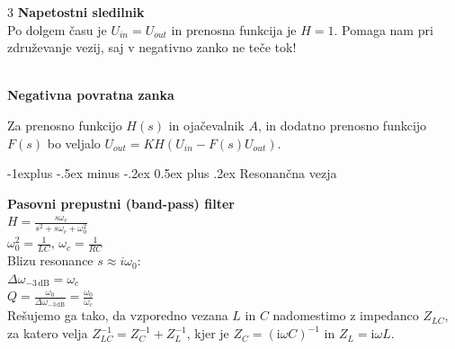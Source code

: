 \documentclass[10pt,landscape]{article}
\makeatletter
\renewcommand{\subsection}{\@startsection{subsection}{2}{0mm}%
	{-1explus -.5ex minus -.2ex}%
	{0.5ex plus .2ex}%
	{\normalfont\normalsize\bfseries}}
\theoremstyle{definition}
\makeatother
\begin{document}
\begin{multicols}{3}
  \textbf{Napetostni sledilnik} \\ 

  Po dolgem času je \( U_{in} = U_{out} \) in prenosna funkcija je \( H = 1 \). Pomaga nam pri združevanje vezij, saj v negativno zanko ne teče tok!
  \vspace{-35pt}
  \begin{circuitikz}
  \end{circuitikz} \vspace{20pt}\\

  \textbf{Negativna povratna zanka}

  Za prenosno funkcijo \( H(s) \) in ojačevalnik \( A \), in dodatno prenosno funkcijo \( F(s) \) bo veljalo \( U_{out} = K H \left( U_{in} - F(s) U_{out} \right) \).

  \subsection{Resonančna vezja}

  \textbf{Pasovni prepustni (band-pass) filter} \\
  $H = \frac{s \omega_c}{s^2 + s \omega_c + \omega_0^2}$\\
  $\omega_0^2 = \frac{1}{LC}$, \qquad $\omega_c = \frac{1}{RC}$ \\
  Blizu resonance $s \approx i \omega_0$: \\
  $\Delta \omega_{-3 \, \text{dB}} = \omega_c$ \\
  $Q = \frac{\omega_0}{\Delta \omega_{-3 \, \text{dB}}} = \frac{\omega_0}{\omega_c}$ \\

  Rešujemo ga tako, da vzporedno vezana \( L \) in \( C \) nadomestimo z impedanco \( Z_{LC} \), za katero velja \( Z_{LC}^{-1} = Z_C^{-1} + Z_L^{-1} \), kjer je \( Z_C = \left( \mathrm{i} \omega C \right)^{-1} \) in \( Z_L = \mathrm{i} \omega L \).
  \vspace{-17pt}
  \begin{center}
    \begin{circuitikz}
    \end{circuitikz} 
  \end{center}\vspace{-35pt}


\end{multicols}
\end{document}

